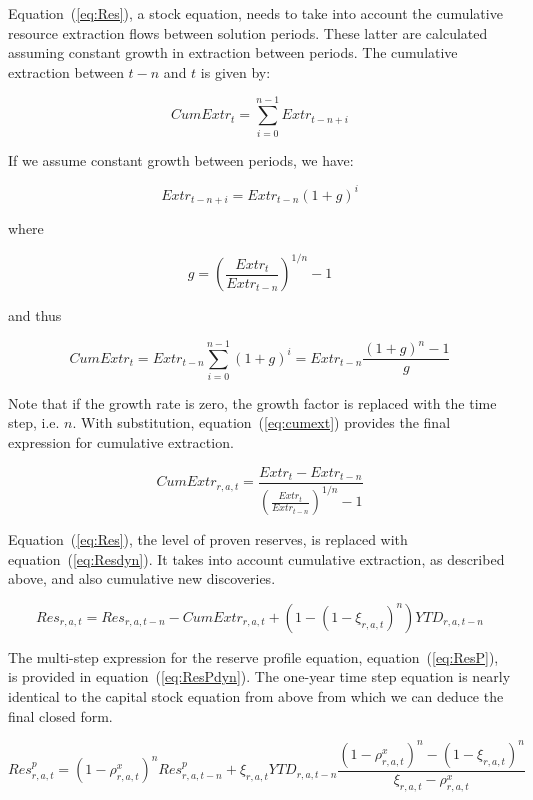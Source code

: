Equation~(\ref{eq:Res}), a stock equation, needs to take into account
the cumulative resource extraction flows between solution periods. These
latter are calculated assuming constant growth in extraction between 
periods. The cumulative
extraction between $t-n$ and $t$ is given by:

\[
\mathit{CumExtr}_t = \sum_{i=0}^{n-1}{\mathit{Extr}_{t-n+i}}
\]

\noindent If we assume constant growth between periods, we have:

\[
\mathit{Extr}_{t-n+i} = \mathit{Extr}_{t-n}\left(1 + g\right)^i
\]

\noindent where

\[
g = \left( \frac{\mathit{Extr}_{t}}{\mathit{Extr}_{t-n}} \right)^{1/n} - 1
\]

\noindent and thus

\[
\mathit{CumExtr}_t = \mathit{Extr}_{t-n} \displaystyle \sum_{i=0}^{n-1}{(1+g)^i} 
= \mathit{Extr}_{t-n} \displaystyle \frac{\left( 1+g \right)^n - 1} {g}
\]

\noindent Note that if the growth rate is zero, the growth
factor is replaced with the time step, i.e. $n$. With substitution, equation~(\ref{eq:cumext}) provides the final
expression for cumulative extraction.

\begin{equation}
\label{eq:cumext}
\mathit{CumExtr}_{r,a,t} = \frac{\mathit{Extr}_{t} - \mathit{Extr}_{t-n}}
{\displaystyle \left(\frac{\mathit{Extr}_{t}}{\mathit{Extr}_{t-n}}\right)^{1/n} - 1}
\end{equation}

Equation~(\ref{eq:Res}), the level of proven reserves, is replaced with equation~(\ref{eq:Resdyn}). It takes
into account cumulative extraction, as described above, and also
cumulative new discoveries.

\begin{equation}
\label{eq:Resdyn}
\mathit{Res}_{r,a,t} = \mathit{Res}_{r,a,t-n} - \mathit{CumExtr}_{r,a,t} 
+ \left( 1 - (1 - \xi_{r,a,t})^n \right) \mathit{YTD}_{r,a,t-n}
\end{equation}

The multi-step expression for the reserve profile equation, equation~(\ref{eq:ResP}), is provided in equation~(\ref{eq:ResPdyn}).
The one-year time step equation is nearly identical to the capital
stock equation from above from which we can deduce the final
closed form.

\begin{equation}
\label{eq:ResPdyn}
\mathit{Res}^p_{r,a,t} = \left(1 - \rho^x_{r,a,t} \right)^n \mathit{Res}^p_{r,a,t-n} + \xi_{r,a,t} \mathit{YTD}_{r,a,t-n}
\frac{\left(1 - \rho^x_{r,a,t} \right)^n - \left(1 - \xi_{r,a,t} \right)^n }{\xi_{r,a,t} - \rho^x_{r,a,t}}
\end{equation}

